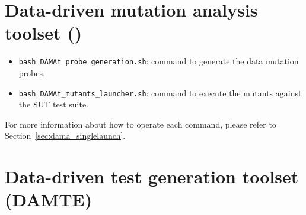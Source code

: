 {\section{Data-driven mutation analysis toolset (\DAMA)}
\begin{itemize}
\item \texttt{bash DAMAt_probe_generation.sh}: command to generate the data mutation probes.
\item \texttt{bash DAMAt_mutants_launcher.sh}: command to execute the mutants against the SUT test suite.
\end{itemize}

For more information about how to operate each command, please refer to Section~\ref{sec:dama_singlelaunch}.

\section{Data-driven test generation toolset (DAMTE)}
}
